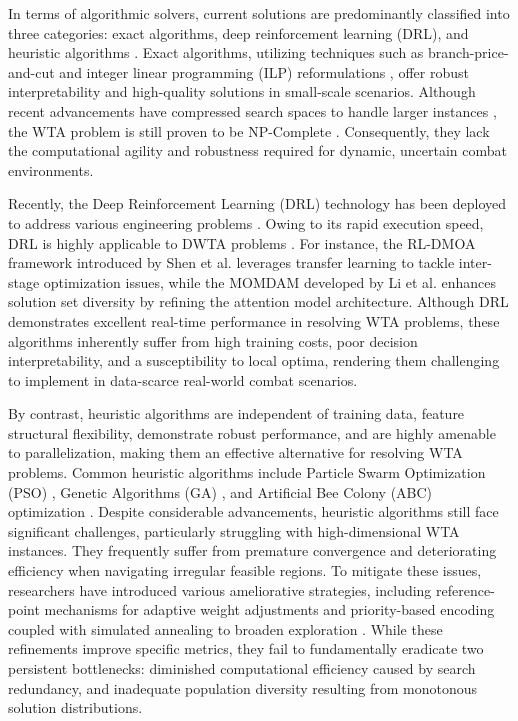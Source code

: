 \documentclass[lettersize,journal]{IEEEtran}
\begin{document}
In terms of algorithmic solvers, current solutions are predominantly classified into three categories: exact algorithms, deep reinforcement learning (DRL), and heuristic algorithms \cite{liu2025current}. Exact algorithms, utilizing techniques such as branch-price-and-cut \cite{bertsimas2025solving} and integer linear programming (ILP) reformulations \cite{lu2021new}, offer robust interpretability and high-quality solutions in small-scale scenarios. Although recent advancements have compressed search spaces to handle larger instances \cite{lu2021new}, the WTA problem is still proven to be NP-Complete \cite{day1966allocating}. Consequently, they lack the computational agility and robustness required for dynamic, uncertain combat environments.

Recently, the Deep Reinforcement Learning (DRL) technology has been deployed to address various engineering problems \cite{shao2025deep, li2024double, shen2025deep}. Owing to its rapid execution speed, DRL is highly applicable to DWTA problems \cite{oh2025artificial}. For instance, the RL-DMOA framework introduced by Shen et al. \cite{shen2025reinforcement} leverages transfer learning to tackle inter-stage optimization issues, while the MOMDAM developed by Li et al. \cite{li2023deep} enhances solution set diversity by refining the attention model architecture. Although DRL demonstrates excellent real-time performance in resolving WTA problems, these algorithms inherently suffer from high training costs, poor decision interpretability, and a susceptibility to local optima, rendering them challenging to implement in data-scarce real-world combat scenarios.

By contrast, heuristic algorithms are independent of training data, feature structural flexibility, demonstrate robust performance, and are highly amenable to parallelization, making them an effective alternative for resolving WTA problems. Common heuristic algorithms include Particle Swarm Optimization (PSO) \cite{li2022multi}, Genetic Algorithms (GA) \cite{li2018improved}, and Artificial Bee Colony (ABC) optimization \cite{chang2018solving}. Despite considerable advancements, heuristic algorithms still face significant challenges, particularly struggling with high-dimensional WTA instances. They frequently suffer from premature convergence and deteriorating efficiency when navigating irregular feasible regions. To mitigate these issues, researchers have introduced various ameliorative strategies, including reference-point mechanisms for adaptive weight adjustments \cite{yi2024solving} and priority-based encoding coupled with simulated annealing to broaden exploration \cite{chang2023adaptive}. While these refinements improve specific metrics, they fail to fundamentally eradicate two persistent bottlenecks: diminished computational efficiency caused by search redundancy, and inadequate population diversity resulting from monotonous solution distributions.
\end{document}
